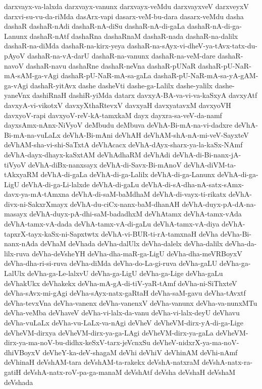 {darxvayx-va-lalxda
darxvayx-vanunx
darxvayx-veMdu
darxvayxveV
darxveyxV
darxvi-su-vu-da-riMda
dasArx-vapi
dasarx-veM-bu-dara
dasarx-veMdu
dasha
dashaR
dashaR-nAdi
dashaR-nA-diSu
dashaR-nA-di-gaLa
dashaR-nA-di-ga-Lanunx
dashaR-nAtf
dashaRna
dashaRnaM
dashaR-nada
dashaR-na-dalilx
dashaR-na-diMda
dashaR-na-kirx-yeya
dashaR-na-sAyx-vi-dheV-ya-tAvx-tatx-du-pAyoV
dashaR-na-vA-darU
dashaR-na-vanunx
dashaR-na-veM-dare
dashaR-navoV
dashaR-navu
dashaRne
dashaR-neVna
dashaR-pUNaR
dashaR-pU-NaR-mA-sAM-ga-vAgi
dashaR-pU-NaR-mA-sa-gaLa
dashaR-pU-NaR-mA-sa-yA-gAM-ga-vAgi
dashaR-yitAvx
dashe
dasheVti
dashe-ga-Lalilx
dashe-yalilx
dashe-yaneVnx
dashiRnaH
dashiR-yiMda
datarx
davxyA-BA-va-vi-va-kaSxyA
davxyAtf
davxyA-vi-vikotxV
davxyXthaRtevxV
davxyaH
davxyatavxM
davxyoVH
davxyoV-rapi
davxyoV-reV-kA-tamxkaM
dayx
dayxra-sa-veV-da-namf
dayxsAmx-nAnx-NiVyoV
deMbudu
deMbuva
deVhA-Bi-mA-na-vi-dadxre
deVhA-Bi-mA-na-vuLaLx
deVhA-Bi-mAni
deVhAH
deVhAM-shA-nA-mi-veV-SayxteV
deVhAM-sha-vi-shi-SaTxtA
deVhAcacx
deVhA-dAyx-sharx-ya-la-kaSx-NAmf
deVhA-dayx-dhayx-kaSxtAM
deVhAdhaRM
deVhAdi
deVhA-di-Bi-nanx-jA-tiVyoV
deVhA-diBx-nanxsayx
deVhA-di-Savx-Bi-mAnoV
deVhA-diVM-ta-tAkxyaRM
deVhA-di-gaLa
deVhA-di-ga-Lalilx
deVhA-di-ga-Lanunx
deVhA-di-ga-LigU
deVhA-di-ga-Li-lalxde
deVhA-di-gaLu
deVhA-di-sA-dha-nA-satx-sAmx-davx-ya-mA-tAmxna
deVhA-di-saM-baMdhaM
deVhA-di-vayx-ti-rikatx
deVhA-divx-ni-SakxrXmayx
deVhA-du-ciCx-nanx-baM-dhanAH
deVhA-duyx-pA-dA-na-masayx
deVhA-duyx-pA-dhi-saM-badadhxM
deVhAtamx
deVhA-tamx-vAda
deVhA-tamx-vA-dada
deVhA-tamx-vA-di-gaLu
deVhA-tamx-vA-diya
deVhA-tapxrX-tayx-kaSx-ni-Sapxtwtx
deVhA-vi-BUR-ti-rA-tamxnaH
deVha
deVha-Bi-nanx-nAda
deVhaM
deVhada
deVha-dalUlx
deVha-dalelx
deVha-dalilx
deVha-da-lilx-ruva
deVha-deVsheYH
deVha-dha-maR-ga-LigU
deVha-dha-meVRBoyxV
deVha-dha-ri-si-ruva
deVha-diMda
deVha-do-La-gi-ruva
deVha-gaLU
deVha-ga-LalUlx
deVha-ga-Le-lalxvU
deVha-ga-LigU
deVha-ga-Lige
deVha-gaLu
deVhakUkx
deVhakekx
deVha-mA-gA-di-tiV-yaR-tAmf
deVha-ni-SiThxteV
deVha-sAvx-mi-gAgi
deVha-sAyx-natx-gaRtaH
deVha-saM-gavu
deVha-tAvxtf
deVha-tevxVna
deVha-vanenx
deVha-vanenxV
deVha-vanunx
deVha-va-nunxMTu
deVha-veMba
deVhaveV
deVha-vi-lalx-da-vanu
deVha-vi-lalx-deyU
deVhavu
deVha-vuLaLx
deVha-vu-LaLx-va-nAgi
deVheV
deVheVM-dirx-yA-di-ga-Lige
deVheVM-dirxya
deVheVM-dirx-ya-ga-LAgi
deVheVM-dirx-ya-gaLa
deVheVM-dirx-ya-ma-noV-bu-didhx-keSxV-tarx-jeVcnxSu
deVheV-nidxrX-ya-ma-noV-dhiVBoyxV
deVheY-ka-deV-shagaM
deVhi
deVhiV
deVhinAM
deVhi-nAmf
deVhinaH
deVshAM-tara
deVshAM-ta-rakekx
deVshA-natxraM
deVshA-natx-ra-gatiH
deVshA-natx-roV-pa-ga-manaM
deVshAtf
deVsha
deVshaH
deVshaM
deVshada
}
